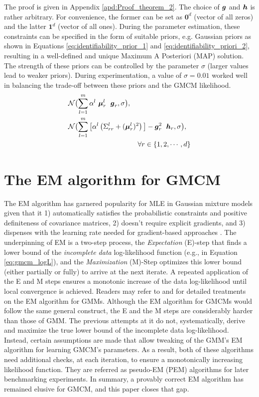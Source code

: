 \documentclass{article}
\theoremstyle{plain}
\theoremstyle{definition}
\theoremstyle{remark}
\begin{document}
The proof is given in Appendix \ref{apd:Proof_theorem_2}. The choice of $\boldsymbol{g}$ and $\boldsymbol{h}$ is rather arbitrary. For convenience, the former can be set as $\mathbf{0}^d$ (vector of all zeros) and the latter $\mathbf{1}^d$ (vector of all ones). During the parameter estimation, these constraints can be specified in the form of suitable priors, e.g. Gaussian priors as shown in Equations \eqref{eq:identifiability_prior_1} and \eqref{eq:identifiability_priori_2}, resulting in a well-defined and unique Maximum A Posteriori (MAP) solution. The strength of these priors can be controlled by the parameter $\sigma$ (larger values lead to weaker priors). During experimentation, a value of $\sigma=0.01$ worked well in balancing the trade-off between these priors and the GMCM likelihood.
\begin{align}
& \mathcal{N}\bigl(\sum_{l=1}^m \alpha^l \ \bs{\mu}_r^l \;\ \bs{g}_r,\sigma \bigr),  \label{eq:identifiability_prior_1} \\
&\mathcal{N}\bigl(\sum_{l=1}^m \big[ \alpha^l \left(\Sigma_{rr}^l+(\bs{\mu}_r^l)^2\right)\big] -\bs{g}_r^2 \; \ \bs{h}_r, \sigma \bigr), \label{eq:identifiability_priori_2}\\
&\qquad \qquad \qquad \qquad \qquad \forall r \in \{1,2,\cdots,d\} \nonumber
\end{align}

\section{The EM algorithm for GMCM}\label{sec:EM}
The EM algorithm has garnered popularity for MLE in Gaussian mixture models given that it 1) automatically satisfies the probabilistic constraints and positive definiteness of covariance matrices, 2) doesn't require explicit gradients, and 3) dispenses with the learning rate needed for gradient-based approaches \citep{Xu1996}. The underpinning of EM is a two-step process, the \emph{Expectation} (E)-step that finds a lower bound of the \emph{incomplete data} log-likelihood function (e.g., in Equation \eqref{eq:gmcm_logL}), and the \emph{Maximization} (M)-Step optimizes this lower bound (either partially or fully) to arrive at the next iterate. A repeated application of the E and M steps ensures a monotonic increase of the data log-likelihood until local convergence is achieved. Readers may refer to \citet{Bilmes98agentle} and \citet{Salakhutdinov2002} for detailed treatments on the EM algorithm for GMMs. Although the EM algorithm for GMCMs would follow the same general construct, the E and the M steps are considerably harder than those of GMM. The previous attempts at it \citep{Tewari2011, Bhattacharya2014} do not, systematically, derive and maximize the true lower bound of the incomplete data log-likelihood. Instead, certain assumptions are made that allow tweaking of the GMM's EM algorithm for learning GMCM's parameters. As a result, both of these algorithms need additional checks, at each iteration, to ensure a monotonically increasing likelihood function. They are referred as pseudo-EM (PEM) algorithms for later benchmarking experiments. In summary, a provably correct EM algorithm has remained elusive for GMCM, and this paper closes that gap.
\end{document}

